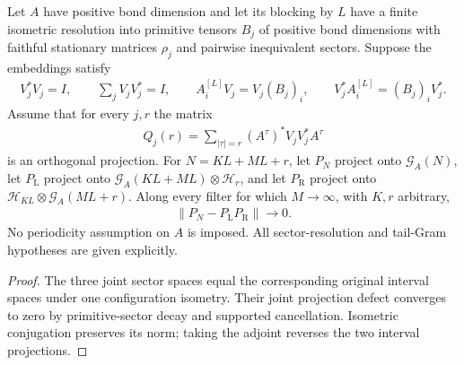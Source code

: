 \begin{lemma}
    \label{thm:physical_residual_cover_limit_primitive_resolution}
    \leanok
    Let $A$ have positive bond dimension and let its blocking by $L$ have
    a finite isometric resolution into primitive tensors $B_j$ of positive
    bond dimensions with
    faithful stationary matrices $\rho_j$ and pairwise inequivalent
    sectors. Suppose the embeddings satisfy
    \begin{align}
        V_j^*V_j=I,\qquad \sum_jV_jV_j^*=I,\qquad
        A^{[L]}_iV_j=V_j(B_j)_i,\qquad
        V_j^*A^{[L]}_i=(B_j)_iV_j^*.
    \end{align}
    Assume that for every $j,r$ the matrix
    \begin{align}
        Q_j(r)=\sum_{|\tau|=r}(A^\tau)^*V_jV_j^*A^\tau
    \end{align}
    is an orthogonal projection. For $N=KL+ML+r$, let $P_N$ project
    onto $\mathcal G_A(N)$, let $P_{\mathrm L}$ project onto
    $\mathcal G_A(KL+ML)\otimes\mathcal H_r$, and let
    $P_{\mathrm R}$ project onto
    $\mathcal H_{KL}\otimes\mathcal G_A(ML+r)$.
    Along every filter for which $M\to\infty$, with $K,r$ arbitrary,
    \begin{align}
        \|P_N-P_{\mathrm L}P_{\mathrm R}\|\longrightarrow0.
    \end{align}
    No periodicity assumption on $A$ is imposed. All sector-resolution
    and tail-Gram hypotheses are given explicitly.
\end{lemma}
\begin{proof}\leanok
    The three joint sector spaces equal the corresponding original
    interval spaces under one configuration isometry. Their joint
    projection defect converges to zero by primitive-sector decay and
    supported cancellation. Isometric conjugation preserves its norm;
    taking the adjoint reverses the two interval projections.
\end{proof}

